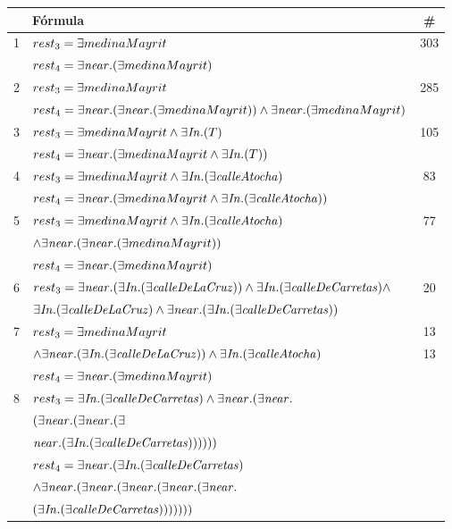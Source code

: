 \label{formulas-plurales}
\begin{table}[h]
\begin{center}
\begin{tabular}{|l|l|c|}
\hline
&F\'ormula			      &  \# \\ \hline \hline

1&$rest_3 = \exists medinaMayrit$ &303\\
 &$rest_4 = \exists \mathit{near}.(\exists medinaMayrit)$& \\ \hline

2&$rest_3 = \exists medinaMayrit$ & 285\\  
 &$rest_4 =  \exists \mathit{near}. (\exists \mathit{near}.(\exists medinaMayrit)) \land \exists \mathit{near}.(\exists medinaMayrit)$& \\ \hline

3&$rest_3 =\exists medinaMayrit \land \exists \mathit{In}.(T)$ & 105\\ 
 &$rest_4 =\exists \mathit{near}.(\exists medinaMayrit \land \exists \mathit{In}.(T))$& \\ \hline

4&$rest_3 =\exists medinaMayrit \land \exists \mathit{In}.(\exists \mathit{calleAtocha})$ &83 \\ 
 &$rest_4 =\exists \mathit{near}.(\exists medinaMayrit  \land \exists \mathit{In}.(\exists \mathit{calleAtocha}))$& \\ \hline

5&$rest_3 =\exists medinaMayrit  \land \exists \mathit{In}.(\exists \mathit{calleAtocha})$&77 \\ 
 &$\land \exists \mathit{near}.(\exists \mathit{near}.(\exists medinaMayrit))$& \\
&$rest_4 = \exists \mathit{near}.(\exists medinaMayrit)$& \\ \hline

6&$rest_3 =\exists \mathit{near}.(\exists \mathit{In}.(\exists \mathit{calleDeLaCruz}))  \land \exists \mathit{In}.(\exists \mathit{calleDeCarretas}) \land $ & 20\\
&$\exists \mathit{In}.(\exists \mathit{calleDeLaCruz})  \land \exists \mathit{near}.(\exists \mathit{In}.(\exists \mathit{calleDeCarretas}))$& \\ \hline

7&$rest_3 =\exists medinaMayrit  $&13 \\ 
&$\land \exists \mathit{near}.(\exists \mathit{In}.(\exists \mathit{calleDeLaCruz}))  \land \exists \mathit{In}.(\exists \mathit{calleAtocha})$ & 13\\
&$rest_4 = \exists \mathit{near}.(\exists medinaMayrit)$&\\ \hline

8&$rest_3 =\exists \mathit{In}.(\exists \mathit{calleDeCarretas})  \land \exists \mathit{near}.(\exists \mathit{near}.$&\\
&$(\exists \mathit{near}.(\exists \mathit{near}.(\exists$ &\\
&$\mathit{near}.(\exists \mathit{In}.(\exists \mathit{calleDeCarretas})))))) $&\\
&$rest_4 = \exists \mathit{near}.(\exists \mathit{In}.(\exists \mathit{calleDeCarretas})  $ & \\
&$\land \exists \mathit{near}.(\exists \mathit{near}.(\exists \mathit{near}.(\exists \mathit{near}.(\exists \mathit{near}.$&\\
&$(\exists \mathit{In}.(\exists \mathit{calleDeCarretas})))))))$&\\ \hline


\end{tabular}
\end{center}
\end{table}
